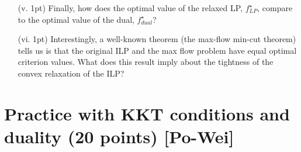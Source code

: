\documentclass{article}
\theoremstyle{remark}
\theoremstyle{definition}
\begin{document}
\begin{enumerate}
\begin{enumerate}
		\item[ (v. 1pt)]  Finally, how does the optimal value of the relaxed LP, $f^{\star}_{LP}$, compare to the optimal value of the dual, $f^{\star}_{dual}$? 
		\item[(vi. 1pt)] Interestingly, a well-known theorem (the max-flow min-cut theorem) tells us is that the original ILP and the max flow problem have equal optimal criterion values. What does this result imply about the tightness of the convex relaxation of the ILP?
		\end{enumerate}

\end{enumerate}
\section{Practice with KKT conditions and duality (20 points) [Po-Wei]}
\end{document}
